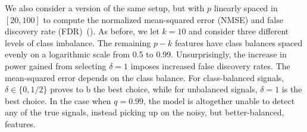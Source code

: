 We also consider a version of the same setup, but with \(p\) linearly spaced in \([20, 100]\) to compute the normalized mean-squared error (NMSE) and false discovery rate (FDR)~(). As before, we let \(k = 10\) and consider three different levels of class imbalance. The remaining \(p-k\) features have class balances spaced evenly on a logarithmic scale from 0.5 to 0.99. Unsurprisingly, the increase in power gained from selecting \(\delta = 1\) imposes increased false discovery rates. The mean-squared error depends on the class balance. For class-balanced signals, \(\delta \in \{0, 1/2\}\) proves to b the best choice, while for unbalanced signals, \(\delta = 1\) is the best choice. In the case when \(q = 0.99\), the model is altogether unable to detect any of the true signals, instead picking up on the noisy, but better-balanced, features.

